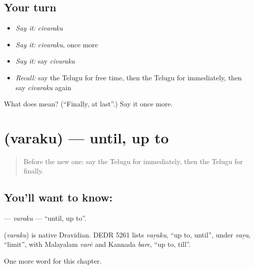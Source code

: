 \subsection*{Your turn}
\begin{itemize}
\raggedright
  \item \emph{Say it:} \emph{civaraku}
  \item \emph{Say it:} \emph{civaraku}, once more
  \item \emph{Say it:} say \emph{civaraku}
  \item \emph{Recall:} say the Telugu for free time, then the Telugu for immediately, then say \emph{civaraku} again
\end{itemize}

\begin{tcolorbox}[breakable,colback=teal!4,colframe=teal!35!black,title={Before you move on}]
What does  mean? (\textquotedblleft{}Finally, at last\textquotedblright{}.) Say it once more.
\end{tcolorbox}
\section[\texorpdfstring{\te{వరకు} (varaku)}{వరకు (varaku)}]{ (varaku) — until, up to}

\label{lesson:TE-C212-varaku}



\begin{quote}
Before the new one: say the Telugu for immediately, then the Telugu for finally.
\end{quote}

\subsection*{You'll want to know: }
\textbf{} — \emph{varaku} — \textquotedblleft{}until, up to\textquotedblright{}.

\begin{cousinweb}
\textbf{} (\emph{varaku}) is native Dravidian. DEDR 5261 lists \emph{vaṟaku}, \textquotedblleft{}up to, until\textquotedblright{}, under \emph{vaṟa}, \textquotedblleft{}limit\textquotedblright{}, with Malayalam \emph{varē} and Kannada \emph{bare}, \textquotedblleft{}up to, till\textquotedblright{}.
\end{cousinweb}

\begin{grammarlens}[title={What you've built}]
One more word for this chapter.
\end{grammarlens}

